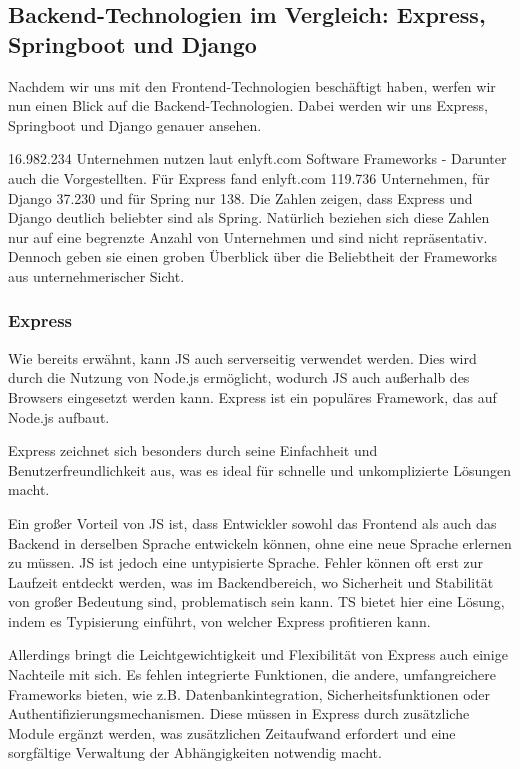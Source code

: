 \documentclass[biblatex]{lni}
\begin{document}
\subsection{Backend-Technologien im Vergleich: Express, Springboot und Django}

Nachdem wir uns mit den Frontend-Technologien beschäftigt haben, werfen wir nun einen Blick auf die Backend-Technologien.
Dabei werden wir uns Express, Springboot und Django genauer ansehen.

16.982.234 Unternehmen nutzen laut enlyft.com Software Frameworks -
Darunter auch die Vorgestellten. \cite{eft}
Für Express fand enlyft.com 119.736 Unternehmen, für Django 37.230 und für Spring nur 138.
Die Zahlen zeigen, dass Express und Django deutlich beliebter sind als Spring.
Natürlich beziehen sich diese Zahlen nur auf eine begrenzte Anzahl von Unternehmen und sind nicht repräsentativ.
Dennoch geben sie einen groben Überblick über die Beliebtheit der Frameworks aus unternehmerischer Sicht.

\subsubsection{Express}

Wie bereits erwähnt, kann \ac{JS} auch serverseitig verwendet werden.
Dies wird durch die Nutzung von Node.js ermöglicht, wodurch \ac{JS} auch außerhalb des Browsers eingesetzt werden kann. \cite{MED}
Express ist ein populäres Framework, das auf Node.js aufbaut.

Express zeichnet sich besonders durch seine Einfachheit und Benutzerfreundlichkeit aus,
was es ideal für schnelle und unkomplizierte Lösungen macht. \cite{EiA}

Ein großer Vorteil von \ac{JS} ist,
dass Entwickler sowohl das Frontend als auch das Backend in derselben Sprache entwickeln können,
ohne eine neue Sprache erlernen zu müssen.
\ac{JS} ist jedoch eine untypisierte Sprache.
Fehler können oft erst zur Laufzeit entdeckt werden, was im Backendbereich,
wo Sicherheit und Stabilität von großer Bedeutung sind, problematisch sein kann.
\ac{TS} bietet hier eine Lösung, indem es Typisierung einführt, von welcher Express profitieren kann. \cite{EX}

Allerdings bringt die Leichtgewichtigkeit und Flexibilität von Express auch einige Nachteile mit sich. \cite{EiA}
Es fehlen integrierte Funktionen, die andere, umfangreichere Frameworks bieten,
wie z.B. Datenbankintegration, Sicherheitsfunktionen oder Authentifizierungsmechanismen.
Diese müssen in Express durch zusätzliche Module ergänzt werden,
was zusätzlichen Zeitaufwand erfordert und eine sorgfältige Verwaltung der Abhängigkeiten notwendig macht.
\end{document}
